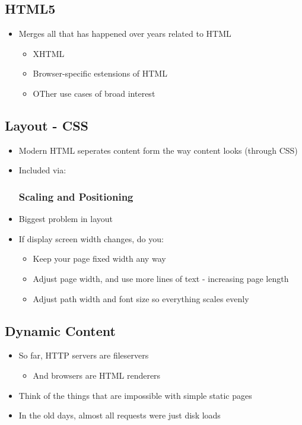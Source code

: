 \subsection{HTML5}
\begin{itemize}
	\item Merges all that has happened over years related to HTML
	\begin{itemize}
		\item XHTML
		\item Browser-specific estensions of HTML
		\item OTher use cases of broad interest
	\end{itemize}
\end{itemize}

\subsection{Layout - CSS}
\begin{itemize}
	\item Modern HTML seperates content form the way content looks (through CSS)
	\item Included via:
	\subsubsection{Scaling and Positioning}
	\item Biggest problem in layout
	\item If display screen width changes, do you:
	\begin{itemize}
		\item Keep your page fixed width any way
		\item Adjust page width, and use more lines of text - increasing page length
		\item Adjust path width and font size so everything scales evenly
	\end{itemize}
\end{itemize}

\subsection{Dynamic Content}
\begin{itemize}
	\item So far, HTTP servers are fileservers
	\begin{itemize}
		\item And browsers are HTML renderers
	\end{itemize}
	\item Think of the things that are impossible with simple static pages
	\item In the old days, almost all requests were just disk loads
\end{itemize}

